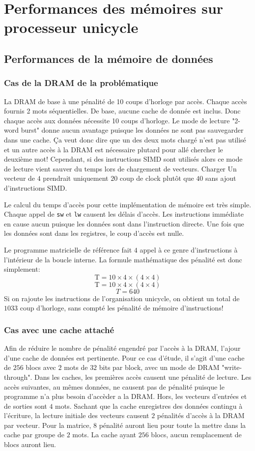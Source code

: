 \documentclass[a11paper]{article}
\begin{document}
\section{Performances des mémoires sur processeur unicycle}
\subsection{Performances de la mémoire de données}
\subsubsection{Cas de la DRAM de la problématique}
La DRAM de base à une pénalité de 10 coups d'horloge par accès. Chaque accès fournis 2 mots séquentielles. De base, aucune cache de donnée est inclus. Donc chaque accès aux données
nécessite 10 coups d'horloge. Le mode de lecture "2-word burst" donne aucun avantage puisque les données ne sont pas sauvegarder dans une cache. Ça veut donc dire que un des deux
mots chargé n'est pas utilisé et un autre accès à la DRAM est nécessaire plutard pour allé chercher le deuxième mot! Cependant, si des instructions SIMD sont utilisés alors ce mode
de lecture vient sauver du temps lors de chargement de vecteurs. Charger Un vecteur de $4$ prendrait uniquement $20$ coup de clock plutôt que $40$ sans ajout d'instructions SIMD.

Le calcul du temps d'accès pour cette implémentation de mémoire est très simple. Chaque appel de \verb|sw| et \verb|lw| causent les délais d'accès. Les instructions immédiate en
cause aucun puisque les données sont dans l'instruction directe. Une fois que les données sont dans les registres, le coup d'accès est nulle.

Le programme matricielle de référence fait $4$ appel à ce genre d'instructions à l'intérieur de la boucle interne. La formule mathématique des pénalité est donc simplement:
$$
\text{T} = 10\times4\times(4\times4)
$$
$$
\text{T} = 10\times4\times(4\times4)
$$
$$
T=640
$$
Si on rajoute les instructions de l'organisation unicycle, on obtient un total de $1033$ coup d'horloge, sans compté les pénalité de mémoire d'instructions!

\subsubsection{Cas avec une cache attaché}
Afin de réduire le nombre de pénalité engendré par l'accès à la DRAM, l'ajour d'une cache de données est pertinente. Pour ce cas d'étude, il s'agit d'une cache de $256$ blocs avec
$2$ mots de $32$ bits par block, avec un mode de DRAM "write-through". Dans les caches, les premières accès causent une pénalité de lecture. Les accès suivantes, au mêmes données,
ne causent pas de pénalité puisque le programme n'a plus besoin d'accèder a la DRAM. Hors, les vecteurs d'entrées et de sorties sont $4$ mots. Sachant que la cache enregistres des 
données contingu à l'écriture, la lecture initiale des vecteurs causent $2$ pénalités d'accès à la DRAM par vecteur. Pour la matrice, $8$ pénalité auront lieu pour toute la mettre
dans la cache par groupe de $2$ mots. La cache ayant $256$ blocs, aucun remplacement de blocs auront lieu.
\end{document}
